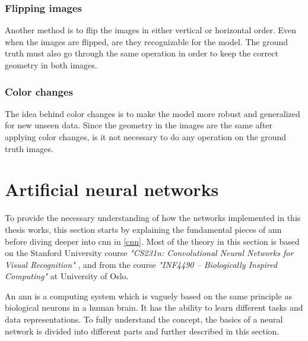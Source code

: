 \documentclass[USenglish]{ifimaster}  %
\begin{document}
\subsubsection{Flipping images}
Another method is to flip the images in either vertical or horizontal order. Even when the images are flipped, are they recognizable for the model. The ground truth must also go through the same operation in order to keep the correct geometry in both images. 
\subsubsection{Color changes}
The idea behind color changes is to make the model more robust and generalized for new unseen data. Since the geometry in the images are the same after applying color changes, is it not necessary to do any operation on the ground truth images.
\section{Artificial neural networks}
To provide the necessary understanding of how the networks implemented in this thesis works, this section starts by explaining the fundamental pieces of \ac{ann} before diving deeper into \ac{cnn} in \cref{cnn}. Most of the theory in this section is based on the Stanford University course \textit{"CS231n: Convolutional Neural Networks for Visual Recognition"} \cite{website:cs231n}, and from the course \textit{"INF4490 – Biologically Inspired Computing"} \cite{website:inf_4490_slp}\cite{website:inf_4490_mlp} at University of Oslo.

An \ac{ann} is a computing system which is vaguely based on the same principle as biological neurons in a human brain. It has the ability to learn different tasks and data representations. To fully understand the concept, the basics of a neural network is divided into different parts and further described in this section.
\end{document}
